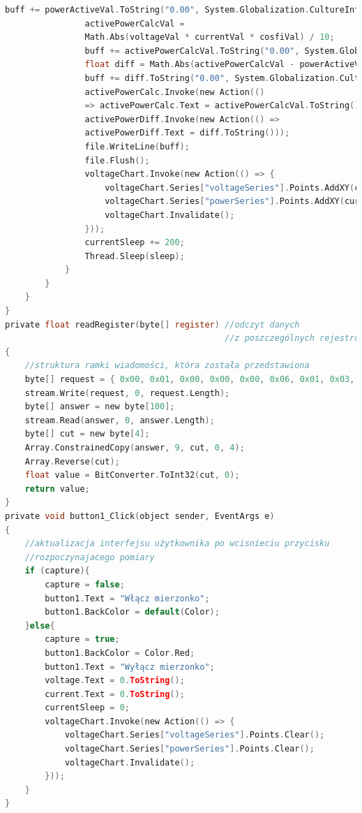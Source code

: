 \documentclass[12pt]{article}
\begin{document}
\begin{lstlisting}[language=c]
                buff += powerActiveVal.ToString("0.00", System.Globalization.CultureInfo.InvariantCulture) + ",";
                activePowerCalcVal =
                Math.Abs(voltageVal * currentVal * cosfiVal) / 10;
                buff += activePowerCalcVal.ToString("0.00", System.Globalization.CultureInfo.InvariantCulture) + ",";
                float diff = Math.Abs(activePowerCalcVal - powerActiveVal);
                buff += diff.ToString("0.00", System.Globalization.CultureInfo.InvariantCulture);
                activePowerCalc.Invoke(new Action(() 
                => activePowerCalc.Text = activePowerCalcVal.ToString()));
                activePowerDiff.Invoke(new Action(() => 
                activePowerDiff.Text = diff.ToString()));
                file.WriteLine(buff);
                file.Flush();
                voltageChart.Invoke(new Action(() => {
                    voltageChart.Series["voltageSeries"].Points.AddXY(currentSleep, voltageVal);
                    voltageChart.Series["powerSeries"].Points.AddXY(currentSleep, powerActiveVal);
                    voltageChart.Invalidate();
                }));
                currentSleep += 200;
                Thread.Sleep(sleep);
            }
        }
    }
}
private float readRegister(byte[] register) //odczyt danych
                                            //z poszczególnych rejestrów
{
    //struktura ramki wiadomości, która została przedstawiona
    byte[] request = { 0x00, 0x01, 0x00, 0x00, 0x00, 0x06, 0x01, 0x03, register[0], register[1], 0x00, 0x02 };
    stream.Write(request, 0, request.Length);
    byte[] answer = new byte[100];
    stream.Read(answer, 0, answer.Length);
    byte[] cut = new byte[4];
    Array.ConstrainedCopy(answer, 9, cut, 0, 4);
    Array.Reverse(cut);
    float value = BitConverter.ToInt32(cut, 0);
    return value;
}
private void button1_Click(object sender, EventArgs e)
{
    //aktualizacja interfejsu użytkownika po wcisnieciu przycisku
    //rozpoczynajacego pomiary
    if (capture){
        capture = false;
        button1.Text = "Włącz mierzonko";
        button1.BackColor = default(Color);
    }else{
        capture = true;
        button1.BackColor = Color.Red;
        button1.Text = "Wyłącz mierzonko";
        voltage.Text = 0.ToString();
        current.Text = 0.ToString();
        currentSleep = 0;
        voltageChart.Invoke(new Action(() => {
            voltageChart.Series["voltageSeries"].Points.Clear();
            voltageChart.Series["powerSeries"].Points.Clear();
            voltageChart.Invalidate();
        }));
    }
}
\end{lstlisting}
\end{document}
